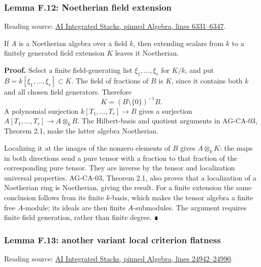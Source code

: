 \documentclass[11pt,a4paper,openany]{report}
\begin{document}
\subsubsection{Lemma F.12: Noetherian field extension}\label{AG-RG-S05-lemma-f.12-noetherian-field-extension}

Reading source: \href{https://github.com/KokunoYumeto/unofficial-stacks-project-ai-drafts/blob/565b10e987aba5969b21145a0833f42d69f96790/algebra.tex\#L6331-L6347}{AI Integrated Stacks, pinned Algebra, lines 6331--6347}.

If \(A\) is a Noetherian algebra over a field \(k\), then extending scalars from \(k\) to a finitely generated field extension \(K\) leaves it Noetherian.

\textbf{Proof.} Select a finite field-generating list \(\xi_1,\ldots,\xi_r\) for \(K/k\), and put \(B=k[\xi_1,\ldots,\xi_r]\subset K\). The field of fractions of \(B\) is \(K\), since it contains both \(k\) and all chosen field generators. Therefore \[K=(B\setminus\{0\})^{-1}B.\] A polynomial surjection \(k[T_1,\ldots,T_r]\to B\) gives a surjection \(A[T_1,\ldots,T_r]\to A\otimes_kB\). The Hilbert-basis and quotient arguments in AG-CA-03, Theorem 2.1, make the latter algebra Noetherian.

Localizing it at the images of the nonzero elements of \(B\) gives \(A\otimes_kK\): the maps in both directions send a pure tensor with a fraction to that fraction of the corresponding pure tensor. They are inverse by the tensor and localization universal properties. AG-CA-03, Theorem 2.1, also proves that a localization of a Noetherian ring is Noetherian, giving the result. For a finite extension the same conclusion follows from its finite \(k\)-basis, which makes the tensor algebra a finite free \(A\)-module; its ideals are then finite \(A\)-submodules. The argument requires finite field generation, rather than finite degree. ∎

\label{AG-RG-S05-algebra-lemma-another-variant-local-criterion-flatness}

\subsubsection{Lemma F.13: another variant local criterion flatness}\label{AG-RG-S05-lemma-f.13-another-variant-local-criterion-flatness}

Reading source: \href{https://github.com/KokunoYumeto/unofficial-stacks-project-ai-drafts/blob/565b10e987aba5969b21145a0833f42d69f96790/algebra.tex\#L24942-L24990}{AI Integrated Stacks, pinned Algebra, lines 24942--24990}.
\end{document}
